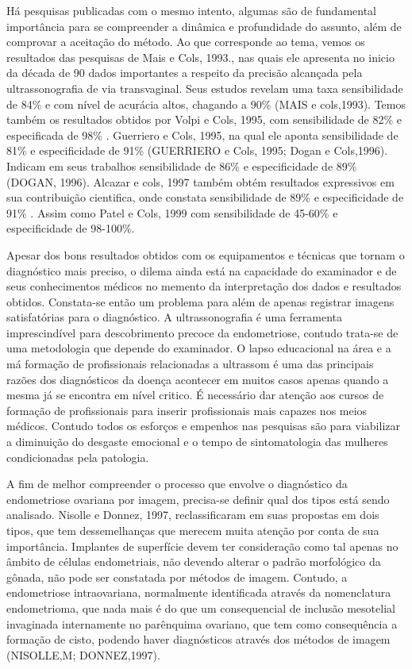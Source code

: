 \documentclass[12pt]{article} %
\begin{document}
Há pesquisas publicadas com o mesmo intento, algumas são de fundamental importância para se compreender a dinâmica e profundidade do assunto, além de comprovar a aceitação do método. Ao que corresponde ao tema, vemos os resultados das pesquisas de Mais e Cols, 1993., nas quais ele apresenta no inicio da década de 90 dados importantes a respeito da precisão alcançada pela ultrassonografia de via transvaginal. Seus estudos revelam uma taxa sensibilidade de 84\% e com nível de acurácia altos, chagando a 90\% (MAIS e cols,1993). Temos também os resultados obtidos por Volpi e Cols, 1995, com sensibilidade de 82\% e especificada de 98\% .  Guerriero e Cols, 1995,  na qual ele aponta sensibilidade de 81\% e especificidade de 91\% (GUERRIERO e Cols, 1995; Dogan e Cols,1996). Indicam em seus trabalhos sensibilidade de 86\% e especificidade de 89\% (DOGAN, 1996). Alcazar e cols, 1997 também obtém resultados expressivos em sua contribuição cientifica, onde constata sensibilidade de 89\% e especificidade de 91\% . Assim como Patel e Cols, 1999 com sensibilidade de 45-60\% e especificidade de 98-100\%. 

Apesar dos bons resultados obtidos com os equipamentos e técnicas que tornam o
diagnóstico mais preciso, o dilema ainda está na capacidade do examinador e de seus conhecimentos médicos no memento da interpretação dos dados e resultados obtidos.  Constata-se então um problema para além de apenas registrar imagens satisfatórias para o diagnóstico. A ultrassonografia é uma ferramenta imprescindível para descobrimento precoce da endometriose, contudo trata-se de uma metodologia que depende do examinador. O lapso educacional na área e a má formação de profissionais relacionadas a ultrassom é uma das principais razões dos diagnósticos da doença acontecer em muitos casos apenas quando a mesma já se encontra em nível critico. É necessário dar atenção aos cursos de formação de profissionais para inserir profissionais mais capazes nos meios médicos. Contudo todos os esforços e empenhos nas pesquisas são para viabilizar a diminuição do desgaste emocional e o tempo de sintomatologia das mulheres condicionadas pela patologia. 

A fim de melhor compreender o processo que envolve o diagnóstico da endometriose ovariana por imagem, precisa-se definir qual dos tipos está sendo analisado. Nisolle e Donnez, 1997, reclassificaram em suas propostas em dois tipos, que tem dessemelhanças que merecem muita atenção por conta de sua importância. Implantes de superfície devem ter consideração como tal apenas no âmbito de células endometriais, não devendo alterar o padrão morfológico da gônada, não pode ser constatada por métodos de imagem. Contudo, a endometriose intraovariana, normalmente identificada através da nomenclatura endometrioma, que nada mais é do que um consequencial de inclusão mesotelial invaginada internamente no parênquima ovariano, que tem como consequência a formação de cisto, podendo haver diagnósticos através dos métodos de imagem (NISOLLE,M; DONNEZ,1997). 
\end{document}
